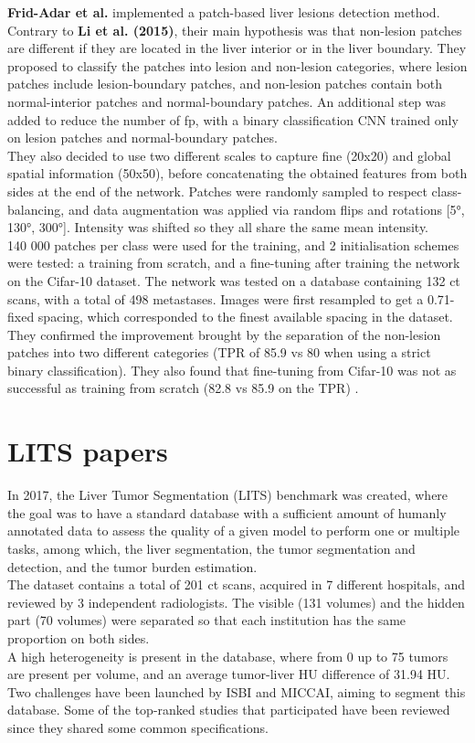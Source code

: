 \textbf{Frid-Adar et al.} implemented a patch-based liver lesions
detection method. Contrary to \textbf{Li et al. (2015)}, their main
hypothesis was that non-lesion patches are different if they are located
in the liver interior or in the liver boundary. They proposed to
classify the patches into lesion and non-lesion categories, where lesion
patches include lesion-boundary patches, and non-lesion patches contain
both normal-interior patches and normal-boundary patches. An additional
step was added to reduce the number of \ac{fp}, with a binary classification
CNN trained only on lesion patches and normal-boundary patches. \\
They also decided to use two different scales to capture fine (20x20)
and global spatial information (50x50), before concatenating the
obtained features from both sides at the end of the network. Patches
were randomly sampled to respect class-balancing, and data augmentation
was applied via random flips and rotations {[}5°, 130°, 300°{]}.
Intensity was shifted so they all share the same mean intensity. \\
140 000 patches per class were used for the training, and 2
initialisation schemes were tested: a training from scratch, and a
fine-tuning after training the network on the Cifar-10 dataset. The
network was tested on a database containing 132 \ac{ct} scans, with a total
of 498 metastases. Images were first resampled to get a 0.71-fixed
spacing, which corresponded to the finest available spacing in the
dataset. They confirmed the improvement brought by the separation of the
non-lesion patches into two different categories (TPR of 85.9 vs 80 when
using a strict binary classification). They also found that fine-tuning
from Cifar-10 was not as successful as training from scratch (82.8 vs
85.9 on the TPR) .

\section{LITS papers}\label{lits-papers}

In 2017, the Liver Tumor Segmentation (LITS) benchmark was created,
where the goal was to have a standard database with a sufficient amount
of humanly annotated data to assess the quality of a given model to
perform one or multiple tasks, among which, the liver segmentation, the
tumor segmentation and detection, and the tumor burden estimation. \\
The dataset contains a total of 201 \ac{ct} scans, acquired in 7 different
hospitals, and reviewed by 3 independent radiologists. The visible (131
volumes) and the hidden part (70 volumes) were separated so that each
institution has the same proportion on both sides. \\
A high heterogeneity is present in the database, where from 0 up to 75
tumors are present per volume, and an average tumor-liver HU difference
of 31.94 HU. \\
Two challenges have been launched by ISBI and MICCAI, aiming to segment
this database. Some of the top-ranked studies that participated have
been reviewed since they shared some common specifications.

